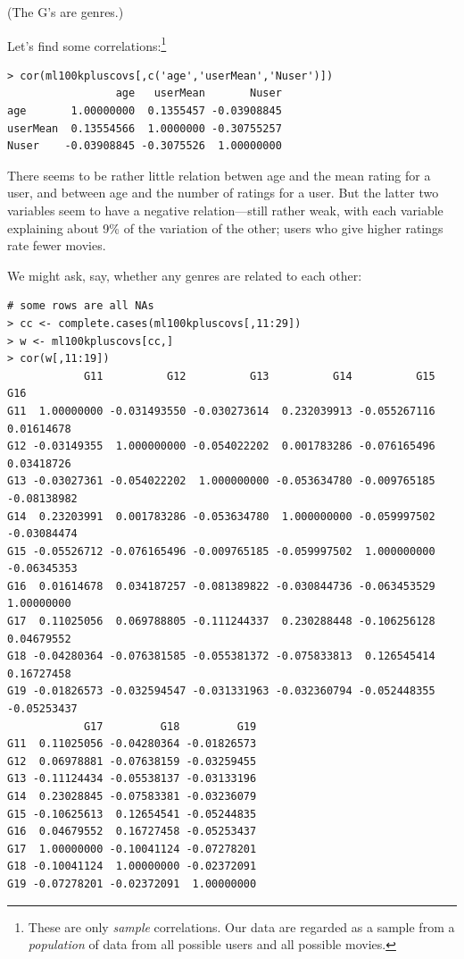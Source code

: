 (The G's are genres.)

Let's find some correlations:\footnote{These are only \textit{sample}
correlations.  Our data are regarded as a sample from a \textit{population}
of data from all possible users and all possible movies.}

\begin{lstlisting}
> cor(ml100kpluscovs[,c('age','userMean','Nuser')])
                 age   userMean       Nuser
age       1.00000000  0.1355457 -0.03908845
userMean  0.13554566  1.0000000 -0.30755257
Nuser    -0.03908845 -0.3075526  1.00000000
\end{lstlisting}

There seems to be rather little relation betwen age and the mean rating
for a user, and between age and the number of ratings for a user.  But
the latter two variables seem to have a negative relation---still rather
weak, with each variable explaining about 9\% of the variation of the
other; users who give higher ratings rate fewer movies.

We might ask, say, whether any genres are related to each other:

\begin{lstlisting}
# some rows are all NAs
> cc <- complete.cases(ml100kpluscovs[,11:29]) 
> w <- ml100kpluscovs[cc,]
> cor(w[,11:19])
            G11          G12          G13          G14          G15         G16
G11  1.00000000 -0.031493550 -0.030273614  0.232039913 -0.055267116  0.01614678
G12 -0.03149355  1.000000000 -0.054022202  0.001783286 -0.076165496  0.03418726
G13 -0.03027361 -0.054022202  1.000000000 -0.053634780 -0.009765185 -0.08138982
G14  0.23203991  0.001783286 -0.053634780  1.000000000 -0.059997502 -0.03084474
G15 -0.05526712 -0.076165496 -0.009765185 -0.059997502  1.000000000 -0.06345353
G16  0.01614678  0.034187257 -0.081389822 -0.030844736 -0.063453529  1.00000000
G17  0.11025056  0.069788805 -0.111244337  0.230288448 -0.106256128  0.04679552
G18 -0.04280364 -0.076381585 -0.055381372 -0.075833813  0.126545414  0.16727458
G19 -0.01826573 -0.032594547 -0.031331963 -0.032360794 -0.052448355 -0.05253437
            G17         G18         G19
G11  0.11025056 -0.04280364 -0.01826573
G12  0.06978881 -0.07638159 -0.03259455
G13 -0.11124434 -0.05538137 -0.03133196
G14  0.23028845 -0.07583381 -0.03236079
G15 -0.10625613  0.12654541 -0.05244835
G16  0.04679552  0.16727458 -0.05253437
G17  1.00000000 -0.10041124 -0.07278201
G18 -0.10041124  1.00000000 -0.02372091
G19 -0.07278201 -0.02372091  1.00000000
\end{lstlisting}

